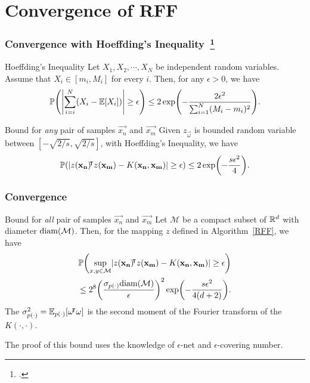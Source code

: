 \documentclass[10pt]{../formats/RU}
\begin{document}
\section{Convergence of RFF}
\begin{frame}
  \frametitle{Convergence with Hoeffding's Inequality~\footcite{vershynin_hdp}}
  \begin{block}{Hoeffding's Inequality}
    Let $X_1, X_2,\cdots, X_N$ be independent random variables. Assume that $X_i \in [m_i, M_i]$ for every $i$. Then, for any $\epsilon > 0$, we have
    \[
    \P{\abs*{\sum_{i=i}^{N}(X_i-\E{X_i})}\geq \epsilon} \leq 2\exp\parens*{-\frac{2\epsilon^2}{\sum_{i=1}^{N}(M_i-m_i)^2}}.
    \]
  \end{block}
  \begin{exampleblock}{Bound for \emph{any} pair of samples $\vec{x_n}$ and $\vec{x_m}$}
    Given $z_{\vec{\omega}}$ is bounded random variable between $[-\sqrt{2/s}, \sqrt{2/s}]$, with Hoeffding's Inequality, we have
    \begin{align*}
      \P{\abs{z(\vec{x_n})\trn z(\vec{x_m})-K(\vec{x_n}, \vec{x_m})}\geq \epsilon} \leq 2\exp\parens*{-\frac{s\epsilon^2}{4}}.
    \end{align*}
  \end{exampleblock}
\end{frame}
\begin{frame}
  \frametitle{Convergence}
  \begin{exampleblock}{Bound for \emph{all} pair of samples $\vec{x_n}$ and $\vec{x_m}$}
    Let $\mathcal{M}$ be a compact subset of $\mathbb{R}^d$ with diameter $\textnormal{diam}(\mathcal{M})$. Then, for the mapping $z$ defined in Algorithm~\ref{RFF}, we have
    \begin{align*}
      \P{\sup_{x,y\in\mathcal{M}}\abs{z(\vec{x_n})\trn z(\vec{x_m})-K(\vec{x_n}, \vec{x_m})}\geq \epsilon} \\
      \leq 2^8\parens*{\frac{\sigma_{p(\cdot)}\textnormal{diam}(\mathcal{M})}{\epsilon}}^2\exp\parens*{-\frac{s\epsilon^2}{4(d+2)}}.
    \end{align*}
    The $\sigma_{p(\cdot)}^2=\mathbb{E}_{p(\cdot)}\bracks*{\vec{\omega}\trn\vec{\omega}}$ is the second moment of the Fourier transform of the $K(\cdot,\cdot)$.
  \end{exampleblock}
  The proof of this bound uses the knowledge of $\epsilon$-net and $\epsilon$-covering number.
\end{frame}

\end{document}
